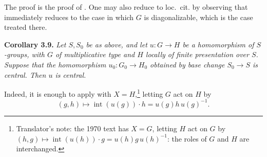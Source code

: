 The proof is the proof of . One may also reduce to loc.\ cit. by
observing that  immediately
reduces to the case in which \(G\) is diagonalizable, which is the case
treated there.

\medskip
\noindent{}\textbf{Corollary 3.9.}
\textit{Let \(S,S_0\) be as above, and let \(u:G\to H\) be a homomorphism
of \(S\)-groups, with \(G\) of multiplicative type and \(H\) locally of
finite presentation over \(S\). Suppose that the homomorphism
\(u_0:G_0\to H_0\) obtained by base change \(S_0\to S\) is central. Then
\(u\) is central.}

Indeed, it is enough to apply
 with \(X=H\),\footnote{Translator's note: the 1970 text has \(X=G\), letting \(H\) act on \(G\) by \((h,g)\mapsto\operatorname{int}(u(h))\cdot g=u(h)g\,u(h)^{-1}\): the roles of \(G\) and \(H\) are interchanged.} letting \(G\) act
on \(H\) by
\[
  (g,h)\longmapsto\operatorname{int}(u(g))\cdot h
  =u(g)h\,u(g)^{-1}.
\]

